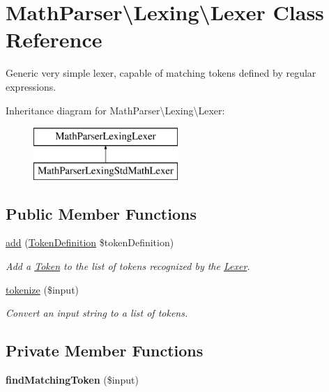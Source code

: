 \hypertarget{classMathParser_1_1Lexing_1_1Lexer}{\section{Math\-Parser\textbackslash{}Lexing\textbackslash{}Lexer Class Reference}
\label{classMathParser_1_1Lexing_1_1Lexer}
}


Generic very simple lexer, capable of matching tokens defined by regular expressions.  


Inheritance diagram for Math\-Parser\textbackslash{}Lexing\textbackslash{}Lexer\-:\begin{figure}[H]
\begin{center}
\leavevmode
\includegraphics[height=2.000000cm]{classMathParser_1_1Lexing_1_1Lexer}
\end{center}
\end{figure}
\subsection*{Public Member Functions}
\begin{DoxyCompactItemize}
\item 
\hyperlink{classMathParser_1_1Lexing_1_1Lexer_aa95d42b7a757af15348f0103e2db3787}{add} (\hyperlink{classMathParser_1_1Lexing_1_1TokenDefinition}{Token\-Definition} \$token\-Definition)
\begin{DoxyCompactList}\small\item\em Add a \hyperlink{classMathParser_1_1Lexing_1_1Token}{Token} to the list of tokens recognized by the \hyperlink{classMathParser_1_1Lexing_1_1Lexer}{Lexer}. \end{DoxyCompactList}\item 
\hyperlink{classMathParser_1_1Lexing_1_1Lexer_a28038b866d03c73744dd9183326a4ae3}{tokenize} (\$input)
\begin{DoxyCompactList}\small\item\em Convert an input string to a list of tokens. \end{DoxyCompactList}\end{DoxyCompactItemize}
\subsection*{Private Member Functions}
\begin{DoxyCompactItemize}
\item 
\hypertarget{classMathParser_1_1Lexing_1_1Lexer_aa6f493838012b4ca4a3a3d6ab447c8d8}{{\bfseries find\-Matching\-Token} (\$input)}\label{classMathParser_1_1Lexing_1_1Lexer_aa6f493838012b4ca4a3a3d6ab447c8d8}

\end{DoxyCompactItemize}

